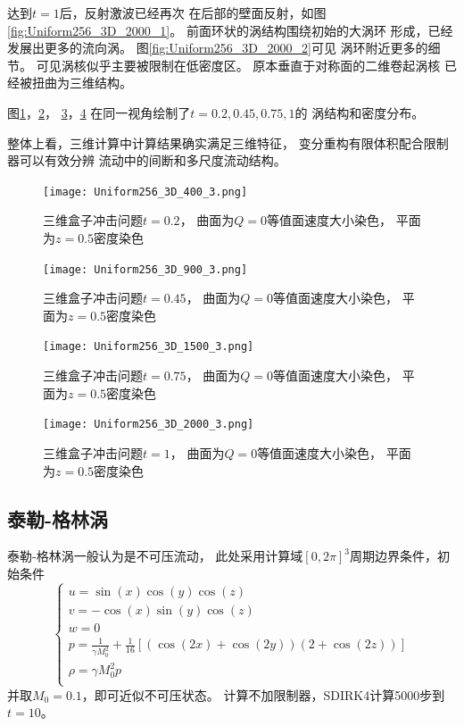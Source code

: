 \documentclass[UTF8,zihao=5]{ctexart} %
\begin{document}
达到$t=1$后，反射激波已经再次
在后部的壁面反射，如图\ref{fig:Uniform256_3D_2000_1}。
前面环状的涡结构围绕初始的大涡环
形成，已经发展出更多的流向涡。
图\ref{fig:Uniform256_3D_2000_2}可见
涡环附近更多的细节。
可见涡核似乎主要被限制在低密度区。
原本垂直于对称面的二维卷起涡核
已经被扭曲为三维结构。

图\ref{fig:Uniform256_3D_400_3}，\ref{fig:Uniform256_3D_900_3}，
\ref{fig:Uniform256_3D_1500_3}，\ref{fig:Uniform256_3D_2000_3}
在同一视角绘制了$t=0.2,0.45,0.75,1$的
涡结构和密度分布。

整体上看，三维计算中计算结果确实满足三维特征，
变分重构有限体积配合限制器可以有效分辨
流动中的间断和多尺度流动结构。



\begin{figure}[htbp]
    \centering
    \texttt{[image: Uniform256\_3D\_400\_3.png]}  %
    \caption{三维盒子冲击问题$t=0.2$，
        曲面为$Q=0$等值面速度大小染色，
        平面为$z=0.5$密度染色}
    \label{fig:Uniform256_3D_400_3}
\end{figure}

\begin{figure}[htbp]
    \centering
    \texttt{[image: Uniform256\_3D\_900\_3.png]}  %
    \caption{三维盒子冲击问题$t=0.45$，
        曲面为$Q=0$等值面速度大小染色，
        平面为$z=0.5$密度染色}
    \label{fig:Uniform256_3D_900_3}
\end{figure}

\begin{figure}[htbp]
    \centering
    \texttt{[image: Uniform256\_3D\_1500\_3.png]}  %
    \caption{三维盒子冲击问题$t=0.75$，
        曲面为$Q=0$等值面速度大小染色，
        平面为$z=0.5$密度染色}
    \label{fig:Uniform256_3D_1500_3}
\end{figure}

\begin{figure}[htbp]
    \centering
    \texttt{[image: Uniform256\_3D\_2000\_3.png]}  %
    \caption{三维盒子冲击问题$t=1$，
        曲面为$Q=0$等值面速度大小染色，
        平面为$z=0.5$密度染色}
    \label{fig:Uniform256_3D_2000_3}
\end{figure}


\subsection{泰勒-格林涡}

泰勒-格林涡一般认为是不可压流动，
此处采用计算域$[0,2\pi]^3$周期边界条件，初始条件
$$
    \left\{
    \begin{array}{l}
        u = \sin(x) \cos(y) \cos(z)  \\
        v = -\cos(x) \sin(y) \cos(z) \\
        w = 0                        \\
        p = \frac{1}{\gamma M_0^2} + \frac{1}{16}\left[
            (\cos(2x) + \cos(2y)) (2 + \cos(2z))
        \right]                      \\
        \rho = \gamma M_0^2 p         \\
    \end{array}
    \right.
$$
并取$M_0=0.1$，即可近似不可压状态。
计算不加限制器，SDIRK4计算5000步到$t=10$。
\end{document}
